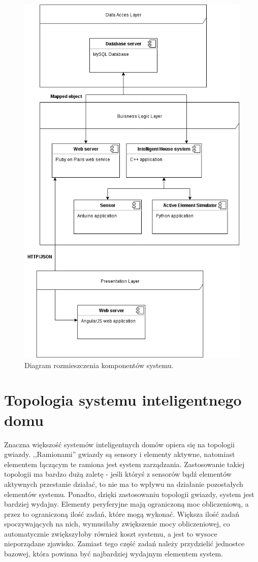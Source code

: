 \documentclass[eng,oneside]{mgr}
\begin{document}
\begin{figure}[h]
\centering
\includegraphics[width=\linewidth]{layers}
\caption{Diagram rozmieszczenia komponentów systemu.}
\label{fig:diagram_rozmieszczenia}
\end{figure}
\clearpage

\section{Topologia systemu inteligentnego domu}
Znaczna większość systemów inteligentnych domów opiera się na topologii gwiazdy. ,,Ramionami'' gwiazdy są sensory i elementy aktywne, natomiast elementem łączącym te ramiona jest system zarządzania. Zastosowanie takiej topologii ma bardzo dużą zaletę - jeśli któryś z sensorów bądź elementów aktywnych przestanie działać, to nie ma to wpływu na działanie pozostałych elementów systemu. Ponadto, dzięki zastosowaniu topologii gwiazdy, system jest bardziej wydajny. Elementy peryferyjne mają ograniczoną moc obliczeniową, a przez to ograniczoną ilość zadań, które mogą wykonać. Większa ilość zadań spoczywających na nich, wymusiłaby zwiększenie mocy obliczeniowej, co automatycznie zwiększyłoby również koszt systemu, a jest to wysoce nieporządane zjawisko. Zamiast tego część zadań należy przydzielić jednostce bazowej, która powinna być najbardziej wydajnym elementem system.
\end{document}
